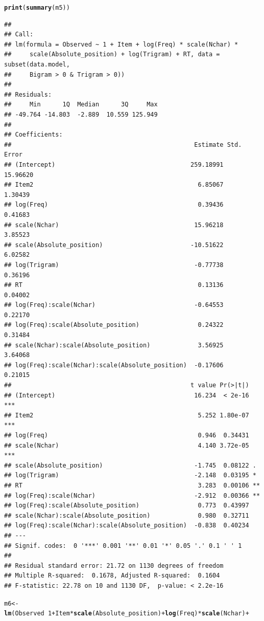 \documentclass{article}\usepackage[]{graphicx}\usepackage[]{color}
\makeatletter
\newcommand{\hlnum}[1]{\textcolor[rgb]{0.686,0.059,0.569}{#1}}%
\newcommand{\hlopt}[1]{\textcolor[rgb]{0,0,0}{#1}}%
\newcommand{\hlstd}[1]{\textcolor[rgb]{0.345,0.345,0.345}{#1}}%
\newcommand{\hlkwb}[1]{\textcolor[rgb]{0.69,0.353,0.396}{#1}}%
\newcommand{\hlkwd}[1]{\textcolor[rgb]{0.737,0.353,0.396}{\textbf{#1}}}%
\newenvironment{kframe}{%
 \def\at@end@of@kframe{}%
 \ifinner\ifhmode%
  \def\at@end@of@kframe{\end{minipage}}%
  \begin{minipage}{\columnwidth}%
 \fi\fi%
 \def\FrameCommand##1{\hskip\@totalleftmargin \hskip-\fboxsep
 \colorbox{shadecolor}{##1}\hskip-\fboxsep
     \hskip-\linewidth \hskip-\@totalleftmargin \hskip\columnwidth}%
 \MakeFramed {\advance\hsize-\width
   \@totalleftmargin\z@ \linewidth\hsize
   \@setminipage}}%
 {\par\unskip\endMakeFramed%
 \at@end@of@kframe}
\newenvironment{knitrout}{}{} %
\makeatother
\begin{document}
\begin{knitrout}
\begin{kframe}
\begin{alltt}
\hlkwd{print}\hlstd{(}\hlkwd{summary}\hlstd{(m5))}
\end{alltt}
\begin{verbatim}
## 
## Call:
## lm(formula = Observed ~ 1 + Item + log(Freq) * scale(Nchar) * 
##     scale(Absolute_position) + log(Trigram) + RT, data = subset(data.model, 
##     Bigram > 0 & Trigram > 0))
## 
## Residuals:
##     Min      1Q  Median      3Q     Max 
## -49.764 -14.803  -2.889  10.559 125.949 
## 
## Coefficients:
##                                                  Estimate Std. Error
## (Intercept)                                     259.18991   15.96620
## Item2                                             6.85067    1.30439
## log(Freq)                                         0.39436    0.41683
## scale(Nchar)                                     15.96218    3.85523
## scale(Absolute_position)                        -10.51622    6.02582
## log(Trigram)                                     -0.77738    0.36196
## RT                                                0.13136    0.04002
## log(Freq):scale(Nchar)                           -0.64553    0.22170
## log(Freq):scale(Absolute_position)                0.24322    0.31484
## scale(Nchar):scale(Absolute_position)             3.56925    3.64068
## log(Freq):scale(Nchar):scale(Absolute_position)  -0.17606    0.21015
##                                                 t value Pr(>|t|)    
## (Intercept)                                      16.234  < 2e-16 ***
## Item2                                             5.252 1.80e-07 ***
## log(Freq)                                         0.946  0.34431    
## scale(Nchar)                                      4.140 3.72e-05 ***
## scale(Absolute_position)                         -1.745  0.08122 .  
## log(Trigram)                                     -2.148  0.03195 *  
## RT                                                3.283  0.00106 ** 
## log(Freq):scale(Nchar)                           -2.912  0.00366 ** 
## log(Freq):scale(Absolute_position)                0.773  0.43997    
## scale(Nchar):scale(Absolute_position)             0.980  0.32711    
## log(Freq):scale(Nchar):scale(Absolute_position)  -0.838  0.40234    
## ---
## Signif. codes:  0 '***' 0.001 '**' 0.01 '*' 0.05 '.' 0.1 ' ' 1
## 
## Residual standard error: 21.72 on 1130 degrees of freedom
## Multiple R-squared:  0.1678,	Adjusted R-squared:  0.1604 
## F-statistic: 22.78 on 10 and 1130 DF,  p-value: < 2.2e-16
\end{verbatim}
\begin{alltt}
\hlstd{m6} \hlkwb{<-} \hlkwd{lm}\hlstd{(Observed} \hlopt{~} \hlnum{1} \hlopt{+} \hlstd{Item} \hlopt{*} \hlkwd{scale}\hlstd{(Absolute_position)} \hlopt{+} \hlkwd{log}\hlstd{(Freq)} \hlopt{*} \hlkwd{scale}\hlstd{(Nchar)} \hlopt{+}

\end{alltt}
\end{kframe}
\end{knitrout}
\end{document}
